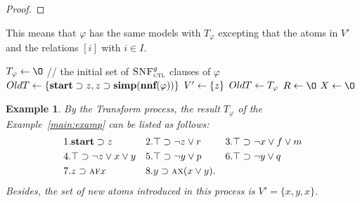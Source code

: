 \documentclass{article}
\newtheorem{example}{Example}
\begin{document}
\begin{proof}
%

\end{proof}

This means that $\varphi$ has the same models with $T_{\varphi}$ excepting that the atoms in $V'$ and the relations $[i]$ with $i\in I$.

\begin{algorithm}[!h]
\caption{$\emph{Transform}(\varphi)$}%
\label{alg:compute:transformation}
$T_{\varphi}\lto {\O}$ // the initial set of ${\textsc{SNF}_{\textsc{ctl}}^g}$ clauses of $\varphi$ \;
$OldT\leftarrow \{\textbf{start} \supset z, z \supset \textbf{simp}(\textbf{nnf}(\varphi))\}$\;
$V'\leftarrow \{z\}$\;
 {
    $OldT\leftarrow T_{\varphi}$\;
    $R\lto {\O}$\;
    $X\lto {\O}$\;
}

\end{algorithm}

\begin{example}\label{examp:Tran}
By the \emph{Transform} process, the result $T_{\varphi}$ of the Example~\ref{main:examp} can be listed as follows:
\begin{align*}
& 1. \textbf{start}\supset z && 2. \top \supset \neg z \vee r && 3.\top \supset \neg x\vee f \vee m\\
& 4. \top \supset \neg z \vee x \vee y && 5.\top \supset \neg y \vee p && 6.\top \supset \neg y \vee q\\
& 7. z \supset \textsc{a} \textsc{f} x && 8. y \supset \textsc{a} \textsc{x}(x\vee y).
\end{align*}
Besides, the set of new atoms introduced in this process is $V'=\{x, y,x\}$.
\end{example}
\end{document}
